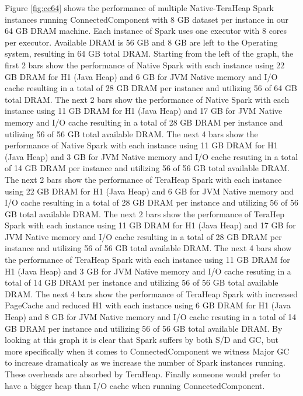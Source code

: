 Figure \ref{fig:cc64} shows the performance of multiple Native-TeraHeap
Spark instances running ConnectedComponent with 8 GB dataset per
instance in our 64 GB DRAM machine. Each instance of Spark uses one
executor with 8 cores per executor. Available DRAM is 56 GB and 8 GB
are left to the Operating system, resulting in 64 GB total DRAM.
Starting from the left of the graph, the first 2 bars show the
performance of Native Spark with each instance using 22 GB DRAM for H1
(Java Heap) and 6 GB for JVM Native memory and I/O cache resulting in
a total of 28 GB DRAM per instance and utilizing 56 of 64 GB total
DRAM. The next 2 bars show the performance of Native Spark with each
instance using 11 GB DRAM for H1 (Java Heap) and 17 GB for JVM Native
memory and I/O cache resulting in a total of 28 GB DRAM per instance
and utilizing 56 of 56 GB total available DRAM. The next 4 bars show
the performance of Native Spark with each instance using 11 GB DRAM
for H1 (Java Heap) and 3 GB for JVM Native memory and I/O cache
resuting in a total of 14 GB DRAM per instance and utilizing 56 of 56
GB total available DRAM. The next 2 bars show the performance of
TeraHeap Spark with each instance using 22 GB DRAM for H1 (Java Heap)
and 6 GB for JVM Native memory and I/O cache resulting in a total of
28 GB DRAM per instance and utilizing 56 of 56 GB total available
DRAM. The next 2 bars show the performance of TeraHep Spark with each
instance using 11 GB DRAM for H1 (Java Heap) and 17 GB for JVM Native
memory and I/O cache resulting in a total of 28 GB DRAM per instance
and utilizing 56 of 56 GB total available DRAM. The next 4 bars show
the performance of TeraHeap Spark with each instance using 11 GB DRAM
for H1 (Java Heap) and 3 GB for JVM Native memory and I/O cache
resuting in a total of 14 GB DRAM per instance and utilizing 56 of 56
GB total available DRAM. The next 4 bars show the performance of
TeraHeap Spark with increased PageCache and reduced H1 with each
instance using 6 GB DRAM for H1 (Java Heap) and 8 GB for JVM Native
memory and I/O cache resuting in a total of 14 GB DRAM per instance
and utilizing 56 of 56 GB total available DRAM.  By looking at this
graph it is clear that Spark suffers by both S/D and GC, but more
specifically when it comes to ConnectedComponent we witness Major GC
to increase dramaticaly as we increase the number of Spark instances
running. These overheads are absorbed by TeraHeap. Finally someone
would prefer to have a bigger heap than I/O cache when running
ConnectedComponent.

